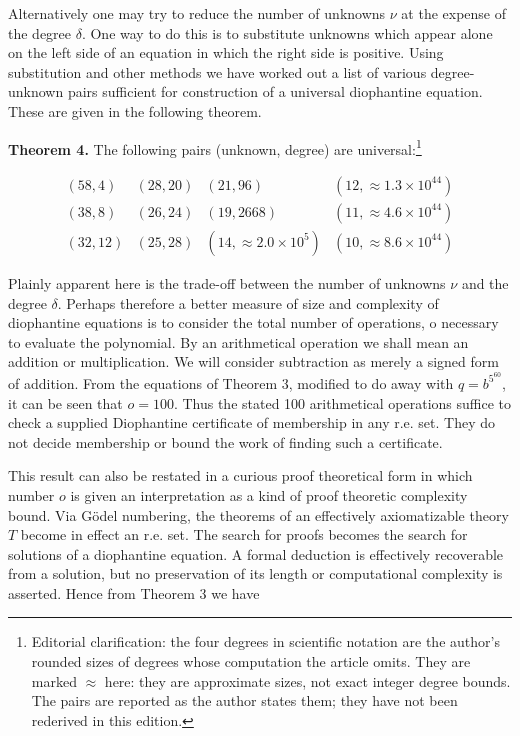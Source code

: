 \documentclass[11pt,a4paper]{article}
\newcommand{\origpage}[1]{\marginnote{\footnotesize\textbf{[#1]}}}
\begin{document}
Alternatively one may try to reduce the number of unknowns $\nu$ at the expense of the degree $\delta$. One way to do this is to substitute unknowns which appear alone on the left side of an equation in which the right side is positive. Using substitution and other methods we have worked out a list of various degree-unknown pairs sufficient for construction of a universal diophantine equation. These are given in the following theorem.

\noindent\textbf{Theorem 4.} The following pairs (unknown, degree) are universal:\footnote{Editorial clarification: the four degrees in scientific notation are the author's rounded sizes of degrees whose computation the article omits. They are marked $\approx$ here: they are approximate sizes, not exact integer degree bounds. The pairs are reported as the author states them; they have not been rederived in this edition.}

\[
\begin{array}{llll}
(58,4)&(28,20)&(21,96)&(12,\approx 1.3\times10^{44})\\
(38,8)&(26,24)&(19,2668)&(11,\approx 4.6\times10^{44})\\
(32,12)&(25,28)&(14,\approx 2.0\times10^{5})&(10,\approx 8.6\times10^{44})
\end{array}
\]

\origpage{553}Plainly apparent here is the trade-off between the number of unknowns $\nu$ and the degree $\delta$. Perhaps therefore a better measure of size and complexity of diophantine equations is to consider the total number of operations, o necessary to evaluate the polynomial. By an arithmetical operation we shall mean an addition or multiplication. We will consider subtraction as merely a signed form of addition. From the equations of Theorem 3, modified to do away with $q=b^{5^{60}}$, it can be seen that $o=100$. Thus the stated 100 arithmetical operations suffice to check a supplied Diophantine certificate of membership in any r.e. set. They do not decide membership or bound the work of finding such a certificate.

This result can also be restated in a curious proof theoretical form in which number $o$ is given an interpretation as a kind of proof theoretic complexity bound. Via Gödel numbering, the theorems of an effectively axiomatizable theory $T$ become in effect an r.e. set. The search for proofs becomes the search for solutions of a diophantine equation. A formal deduction is effectively recoverable from a solution, but no preservation of its length or computational complexity is asserted. Hence from Theorem 3 we have
\end{document}
